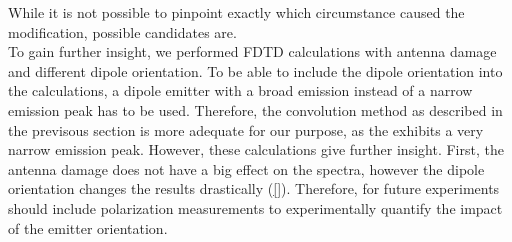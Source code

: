 			While it is not possible to pinpoint exactly which circumstance caused the modification, possible candidates are.
			\\
			To gain further insight, we performed FDTD calculations with antenna damage and different dipole orientation.
			To be able to include the dipole orientation into the calculations, a dipole emitter with a broad emission instead of a narrow emission peak has to be used.
			Therefore, the convolution method as described in the previsous section is more adequate for our purpose, as the \siv exhibits a very narrow emission peak.
			However, these calculations give further insight.
			First, the antenna damage does not have a big effect on the spectra, however the dipole orientation changes the results drastically (\cref{}). 
			Therefore, for future experiments should include polarization measurements to experimentally quantify the impact of the emitter orientation.

